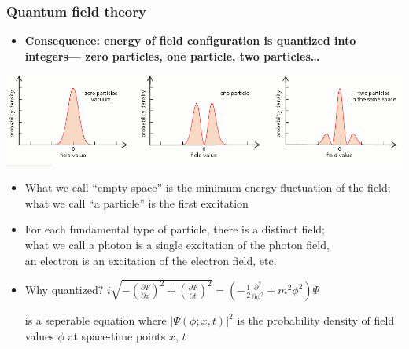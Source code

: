 \documentclass[compress]{beamer}
\begin{document}
\begin{frame}
\frametitle{Quantum field theory}

\begin{itemize}
\item \bf Consequence: energy of field configuration is quantized into
  integers--- zero particles, one particle, two particles\ldots
\end{itemize}

\includegraphics[width=\linewidth]{fieldvalues.png}

\begin{itemize}
\item What we call ``empty space'' is the minimum-energy fluctuation of
  the field; what we call ``a particle'' is the first excitation

\item For each fundamental type of particle, there is a distinct
  field; \\ what we call a photon is a single excitation of the photon
  field, \\ an electron is an excitation of the electron field, etc.

\item<2> Why quantized?  $\displaystyle i \sqrt{-\left(\frac{\partial \Psi}{\partial x}\right)^2 + \left(\frac{\partial \Psi}{\partial t}\right)^2}
= \left( -\frac{1}{2}\frac{\partial^2}{\partial \phi^2} + m^2 \phi^2 \right) \Psi$

is a seperable equation where $\left|\Psi(\phi; x, t)\right|^2$
is the probability density of field values $\phi$ at space-time
points $x$, $t$
\end{itemize}
\end{frame}
\end{document}
